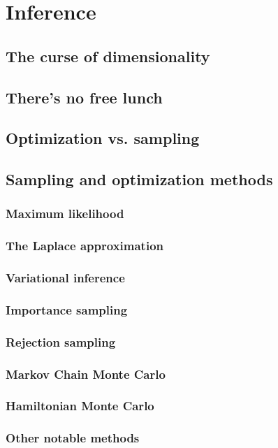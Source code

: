 \documentclass[12pt]{report}
\begin{document}
\section{Inference}
\label{sec:inference}
\subsection{The curse of dimensionality}
\subsection{There's no free lunch}
\subsection{Optimization vs. sampling}
\subsection{Sampling and optimization methods}
\subsubsection{Maximum likelihood}
\subsubsection{The Laplace approximation}
\subsubsection{Variational inference}
\subsubsection{Importance sampling}
\subsubsection{Rejection sampling}
\subsubsection{Markov Chain Monte Carlo}
\subsubsection{Hamiltonian Monte Carlo}
\subsubsection{Other notable methods}
\end{document}
